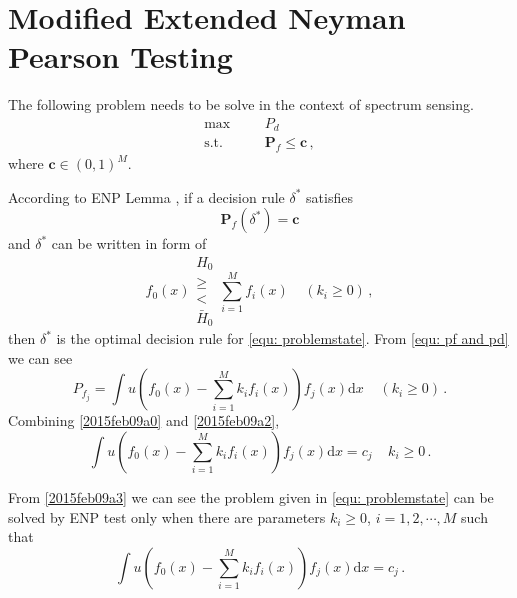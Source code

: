 
\section{Modified Extended Neyman Pearson Testing}

\def \JUDGEMENT{u(f_0(x) - \sum_{j=1}^{M}k_j f_j(x))}

The following problem needs to be solve in the context of spectrum sensing. 
      \begin{equation}
      \label{equ: problemstate}
      \begin{split}
      \max\;\;\;\;\;\;&P_d\\
      \text{s.t.}\;\;\;\;\;\;&\mathbf{P}_f \leq \mathbf{c}\,,
      \end{split}
      \end{equation}
where $\mathbf{c} \in (0, 1)^M$.

According to ENP Lemma , if a decision rule $\delta^\ast$ satisfies 
\begin{equation}
  \label{2015feb09a0}
  \mathbf{P}_f(\delta^\ast) = \mathbf{c}
\end{equation}
and $\delta^\ast$ can be written in form of 
\begin{equation}
  \label{2015feb09a1}
  f_0(x) \substack{H_0 \\ \geq \\ < \\ \bar{H}_0} \sum_{i=1}^{M}f_i(x)\;\;\;\;(k_i \geq 0)\,,
\end{equation}
then $\delta^\ast$ is the optimal decision rule for \eqref{equ: problemstate}. From \eqref{equ: pf and pd}  we can see 
\begin{equation}
  \label{2015feb09a2}
  P_{f_j} = \int u(f_0(x) - \sum_{i=1}^{M}k_if_i(x))f_j(x)\mathrm{d}x \;\;\;\;(k_i \geq 0)\,.
\end{equation}
Combining \eqref{2015feb09a0} and \eqref{2015feb09a2},
\begin{equation}
\int u(f_0(x) - \sum_{i=1}^{M}k_if_i(x))f_j(x)\mathrm{d}x = c_j\;\;\;\;k_i \geq 0\,.
\label{2015feb09a3}
\end{equation}

From \eqref{2015feb09a3} we can see the problem given in \eqref{equ: problemstate} can be solved by ENP test only when there are parameters $k_i \geq 0$, $i = 1, 2, \cdots, M$ such that  
\begin{equation}
\int u(f_0(x) - \sum_{i=1}^{M}k_if_i(x))f_j(x)\mathrm{d}x = c_j\,.
\label{equ: condition for ENP}
\end{equation}

